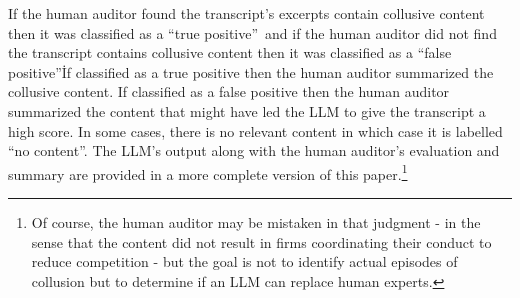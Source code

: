 If the human auditor found the transcript's excerpts contain collusive
content then it was classified as a \textquotedblleft true
positive\textquotedblright\ and if the human auditor did
not find the transcript contains collusive content then it was classified as
a \textquotedblleft false positive\textquotedblright\. If classified as a true positive
then the human auditor summarized the collusive content. If classified as a false positive then the human
auditor summarized the content that might have led the LLM to give the
transcript a high score. In some cases, there is no relevant content in
which case it is labelled \textquotedblleft no content\textquotedblright .
The LLM's output along with the human auditor's evaluation and summary are
provided in a more complete version of this paper.\footnote{%
Of course, the human auditor may be mistaken
in that judgment - in the sense that the content did not result in firms
coordinating their conduct to reduce competition - but the goal is not to
identify actual episodes of collusion but to determine if an LLM can replace
human experts.}
